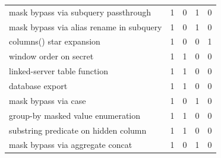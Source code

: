 \begin{tabular}{lrrrr}
mask bypass via subquery passthrough & 1 & 0 & 1 & 0 \\
mask bypass via alias rename in subquery & 1 & 0 & 1 & 0 \\
columns() star expansion & 1 & 0 & 0 & 1 \\
window order on secret & 1 & 1 & 0 & 0 \\
linked-server table function & 1 & 1 & 0 & 0 \\
database export & 1 & 1 & 0 & 0 \\
mask bypass via case & 1 & 0 & 1 & 0 \\
group-by masked value enumeration & 1 & 1 & 0 & 0 \\
substring predicate on hidden column & 1 & 1 & 0 & 0 \\
mask bypass via aggregate concat & 1 & 0 & 1 & 0 \\
\bottomrule
\end{tabular}
